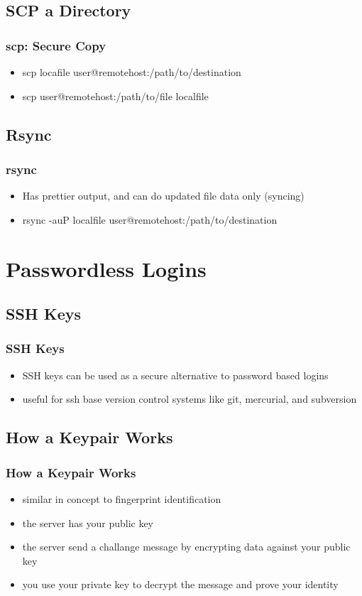 \documentclass[hyperref={pdfpagelabels=false}]{beamer}
\begin{document}
\subsection{SCP a Directory}
\frame
{
    \frametitle{scp: Secure Copy}
    \begin{itemize}
    \item{scp locafile user@remotehost:/path/to/destination}
    \item{scp user@remotehost:/path/to/file localfile}
    \end{itemize}
}
\subsection{Rsync}
\frame
{
    \frametitle{rsync}
    \begin{itemize}
    \item{Has prettier output, and can do updated file data only (syncing)}
    \item{rsync -auP localfile user@remotehost:/path/to/destination}
    \end{itemize}
}
\section{Passwordless Logins}
\subsection{SSH Keys}
\frame
{
    \frametitle{SSH Keys}
    \begin{itemize}
    \item{SSH keys can be used as a secure alternative to password based logins}
    \item{useful for ssh base version control systems like git, mercurial, and subversion}
    \end{itemize}
}
\subsection{How a Keypair Works}
\frame
{
    \frametitle{How a Keypair Works}
    \begin{itemize}
    \item{similar in concept to fingerprint identification}
    \item{the server has your public key}
    \item{the server send a challange message by encrypting data against your public key}
    \item{you use your private key to decrypt the message and prove your identity}
    \end{itemize}
}
\end{document}
